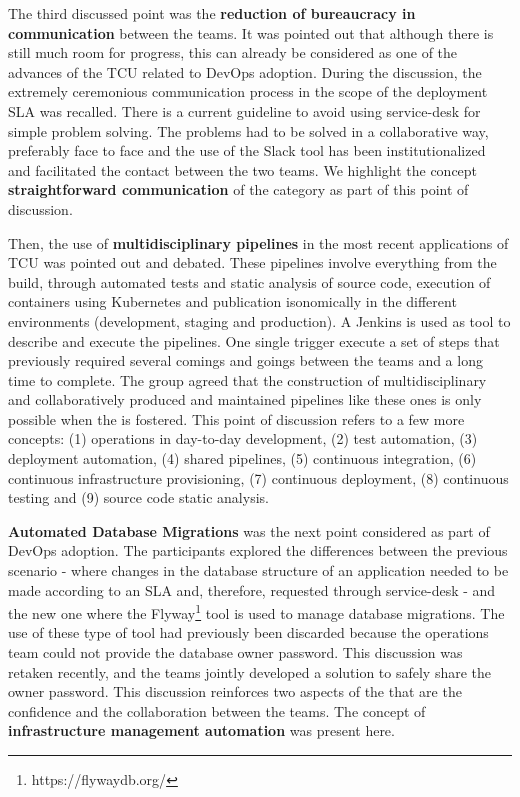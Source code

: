 {The third discussed point was the \textbf{reduction of bureaucracy in communication}
between the teams. It was pointed out that although there is still much room
for progress, this can already be considered as one of the advances of the TCU
related to DevOps adoption. During the discussion, the extremely ceremonious
communication process in the scope of the deployment SLA was recalled. There is
a current guideline to avoid using service-desk for simple problem solving. The
problems had to be solved in a collaborative way, preferably face to face and
the use of the Slack tool has been institutionalized and facilitated the contact
between the two teams. We highlight the concept \textbf{straightforward communication}
of the \cc category as part of this point of discussion.

Then, the use of \textbf{multidisciplinary pipelines} in the most recent applications of
TCU was pointed out and debated. These pipelines involve everything from the
build, through automated tests and static analysis of source code, execution of
containers using Kubernetes and publication isonomically in the different
environments (development, staging and production). A Jenkins is used as tool
to describe and execute the pipelines. One single trigger execute a set of
steps that previously required several comings and goings between the teams and
a long time to complete. The group agreed that the construction of multidisciplinary
and collaboratively produced and maintained pipelines like these ones is only
possible when the \cc is fostered. This point of discussion refers to a few
more concepts: (1) operations in day-to-day development, (2) test automation,
(3) deployment automation, (4) shared pipelines, (5) continuous integration,
(6) continuous infrastructure provisioning, (7) continuous deployment,
(8) continuous testing and (9) source code static analysis.

\textbf{Automated Database Migrations} was the next point considered as part of
DevOps adoption. The participants explored the differences between the previous
scenario - where changes in the database structure of an application needed to be
made according to an SLA and, therefore, requested through service-desk - and
the new one where the Flyway\footnote{https://flywaydb.org/} tool is used to
manage database migrations. The use of these type of tool had previously been
discarded because the operations team could not provide the database owner
password. This discussion was retaken recently, and the teams jointly developed
a solution to safely share the owner password. This discussion reinforces two
aspects of the \cc that are the confidence and the collaboration between the
teams. The concept of \textbf{infrastructure management automation} was present
here.

}

